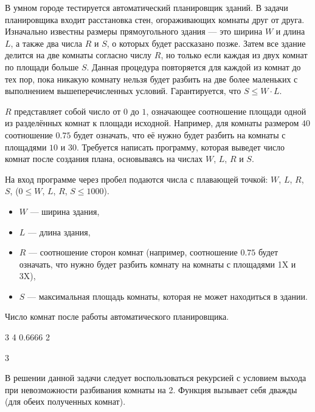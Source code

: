 
В умном городе тестируется автоматический планировщик зданий. В задачи планировщика входит расстановка стен, огораживающих комнаты друг от друга. Изначально известны размеры прямоугольного здания — это ширина $W$ и длина $L$, а также два числа $R$ и $S$, о которых будет рассказано позже. Затем все здание делится на две комнаты согласно числу $R$, но только если каждая из двух комнат по площади больше $S$. Данная процедура повторяется для каждой из комнат до тех пор, пока никакую комнату нельзя будет разбить на две более маленьких с выполнением вышеперечисленных условий. Гарантируется, что $S \leq W \cdot L$.

$R$ представляет собой число от $0$ до $1$, означающее соотношение площади одной из разделённых комнат к площади исходной. Например, для комнаты размером $40$ соотношение $0.75$ будет означать, что её нужно будет разбить на комнаты с площадями $10$ и $30$. Требуется написать программу, которая выведет число комнат после создания плана, основываясь на числах $W$, $L$, $R$ и $S$.


На вход программе через пробел подаются числа с плавающей точкой: $W$, $L$, $R$, $S$, ($0 \leq W$, $L$, $R$, $S \leq 1000$).
\begin{itemize}
    \item $W$ — ширина здания,
    \item $L$ — длина здания,
    \item $R$ — соотношение сторон комнат (например, соотношение $0.75$ будет означать, что нужно будет разбить комнату на комнаты с площадями 1X и 3X),
    \item $S$ — максимальная площадь комнаты, которая не может находиться в здании.
\end{itemize}

\outputfmtSection

Число комнат после работы автоматического планировщика.


\begin{myverbbox}[\small]{\vinput}
    3 4 0.6666 2
\end{myverbbox}
\begin{myverbbox}[\small]{\voutput}
    3
\end{myverbbox}

\solutionSection

В решении данной задачи следует воспользоваться рекурсией с условием выхода при невозможности разбивания комнаты на 2. Функция вызывает себя дважды (для обеих полученных комнат).

